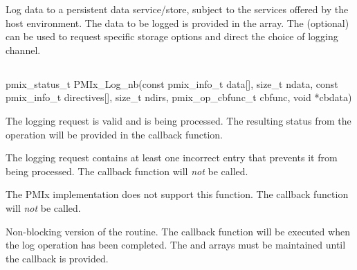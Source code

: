 \descr

Log data to a persistent data service/store, subject to the services offered by the host environment. The data to be logged is provided in the  array. The (optional)  can be used to request specific storage options and direct the choice of logging channel.

\subsection{}

\cspecificstart
\begin{codepar}
pmix_status_t
PMIx_Log_nb(const pmix_info_t data[], size_t ndata,
            const pmix_info_t directives[], size_t ndirs,
            pmix_op_cbfunc_t cbfunc, void *cbdata)
\end{codepar}
\cspecificend

\begin{arglist}
\end{arglist}

\begin{constantdesc}
\item {} The logging request is valid and is being processed. The resulting status from the operation will be provided in the callback function.
\item {} The logging request contains at least one incorrect entry that prevents it from being processed. The callback function will \emph{not} be called.
\item {} The \ac{PMIx} implementation does not support this function. The callback function will \emph{not} be called.
\end{constantdesc}

\descr

Non-blocking version of the  routine. The callback function will be executed when the log operation has been completed. The  and  arrays must be maintained until the callback is provided.


